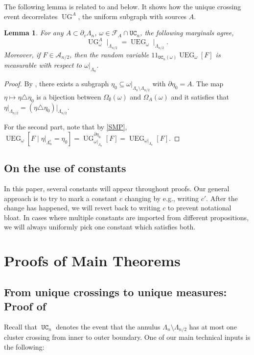 \documentclass[article,11pt,reqno]{amsart}
\DeclareMathOperator*{\UC}{\mathtt{UC}}
\DeclareMathOperator*{\UEG}{UEG}
\newcommand{\id}{1\! \!1}
\newtheorem{lemma}[theorem]{Lemma}
\begin{document}
The following lemma is related to \cite[Proposition 3.6 \& Corollary 3.7]{hansen2023uniform} and  below. It shows how the unique crossing event decorrelates $ \operatorname{UG}^A$, the uniform subgraph with sources $A$. 
\begin{lemma}\label{lemma:UGA_to_UEG}
    For any $A \subset \partial_v \Lambda_n$, $\omega \in  \mathcal{F}_A \cap \mathtt{UC}_n$, the following marginals agree,
    $$
    \operatorname{UG}^A_{\omega}\mid_{\Lambda_{n/2}} = \operatorname{UEG}_{\omega}\mid_{\Lambda_{n/2}}.
    $$
Moreover, if $F \in \mathcal{A}_{n/2}$, then the random variable $\id_{\mathtt{UC}_n(\omega)} \UEG_\omega[F]$ is measurable with respect to $\omega\vert_{\Lambda_n}$.
\end{lemma}
\begin{proof}
    By , there exists a subgraph $\eta_0 \subseteq \omega\vert_{\Lambda_n\setminus\Lambda_{n/2}}$ with $\partial \eta_0 =A$. The map $\eta \mapsto \eta \triangle \eta_0$ is a bijection between $\Omega_{\emptyset}(\omega)$ and $\Omega_A(\omega)$ and it satisfies that $\eta\vert_{\Lambda_{n/2}} = (\eta \triangle \eta_0)\vert_{\Lambda_{n/2}}$.

For the second part, note that by \eqref{SMP},
$\operatorname{UEG}_\omega[F \mid  \eta\vert_{\Lambda_n^c} = \eta_0] = \operatorname{UG}^{\partial \eta_0}_{\omega\vert_{\Lambda_n}}[F] = \operatorname{UEG}_{\omega\vert_{\Lambda_n}}[F].$ 
\end{proof}



\subsection{On the use of constants} In this paper, several constants will appear throughout proofs. Our general approach is to try to mark a constant $c$ changing by e.g., writing $c'$. After the change has happened, we will revert back to writing $c$ to prevent notational bloat. In cases where multiple constants are imported from different propositions, we will always uniformly pick one constant which satisfies both.

\section{Proofs of Main Theorems}\label{sec:proofs_of_main_theorems}
\subsection{From unique crossings to unique measures: Proof of \texorpdfstring{}{Theorem \ref*{thm:Unique_Loop}}} \label{sec:proofofmain}
Recall that $\UC_n$ denotes the event that the annulus $\Lambda_{n}\setminus\Lambda_{n/2}$ has at most one cluster crossing from inner to outer boundary. One of our main technical inputs is the following:
\end{document}
